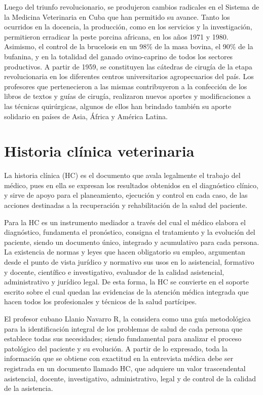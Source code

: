 Luego del triunfo revolucionario, se produjeron cambios radicales en el Sistema de la Medicina Veterinaria en Cuba que han permitido su avance. Tanto los ocurridos en la docencia, la producción, como en los servicios y la investigación, permitieron erradicar la peste porcina africana, en los años 1971 y 1980. Asimismo, el control de la brucelosis en un 98\% de la masa bovina, el 90\% de la bufanina, y en la totalidad del ganado ovino-caprino de todos los sectores productivos.  A partir de 1959, se constituyen las cátedras de cirugía  de la etapa revolucionaria en los diferentes centros universitarios agropecuarios del país. Los profesores que pertenecieron a las mismas contribuyeron a la confección de los libros de textos y guías de cirugía, realizaron nuevos aportes y modificaciones a las técnicas quirúrgicas, algunos de ellos han brindado también su aporte solidario en países de Asia, África y América Latina. 

\section{Historia clínica veterinaria}
La historia clínica (HC) es el documento que avala legalmente el trabajo del médico, pues en ella se expresan los resultados obtenidos en el diagnóstico clínico, y sirve de apoyo para el planeamiento, ejecución y control en cada caso, de las acciones destinadas a la recuperación y rehabilitación de la salud del paciente.  

Para  la HC es un instrumento mediador a través del cual el médico elabora el diagnóstico, fundamenta el pronóstico, consigna el tratamiento y la evolución del paciente, siendo un documento único, integrado y acumulativo para cada persona. La existencia de normas y leyes que hacen obligatorio su empleo, argumentan desde el punto de vista jurídico y normativo sus usos en lo asistencial, formativo y docente, científico e investigativo, evaluador de la calidad asistencial, administrativo y jurídico legal. De esta forma, la HC se convierte en el soporte escrito sobre el cual quedan las evidencias de la atención médica integrada que hacen todos los profesionales y técnicos de la salud partícipes.  

El profesor cubano Llanio Navarro R, la considera como una guía metodológica para la identificación integral de los problemas de salud de cada persona que establece todas sus necesidades; siendo fundamental para analizar el proceso patológico del paciente y su evolución. A partir de lo expresado, toda la información que se obtiene con exactitud en la entrevista médica debe ser registrada en un documento llamado HC, que adquiere un valor trascendental asistencial, docente, investigativo, administrativo, legal y de control de la calidad de la asistencia.   

